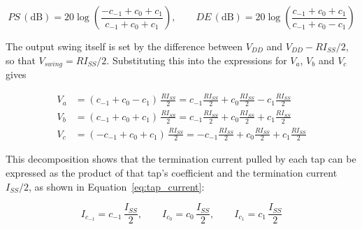 \begin{equation}
PS\,(\mathrm{dB}) = 20\log\left(\frac{-c_{-1}+c_0+c_1}{c_{-1}+c_0+c_1}\right), \qquad
DE\,(\mathrm{dB}) = 20\log\left(\frac{c_{-1}+c_0+c_1}{c_{-1}+c_0-c_1}\right)
\label{eq:tap_coefficients}
\end{equation}

The output swing itself is set by the difference between $V_{DD}$ and $V_{DD} - R I_{SS}/2$, so that $V_{swing} = R I_{SS}/2$. Substituting this into the expressions for $V_a$, $V_b$ and $V_c$ gives

\begin{align}
V_a &= (c_{-1} + c_0 - c_1)\,\frac{R I_{SS}}{2} = c_{-1}\frac{R I_{SS}}{2} + c_0\frac{R I_{SS}}{2} - c_1\frac{R I_{SS}}{2} \\
V_b &= (c_{-1} + c_0 + c_1)\,\frac{R I_{SS}}{2} = c_{-1}\frac{R I_{SS}}{2} + c_0\frac{R I_{SS}}{2} + c_1\frac{R I_{SS}}{2} \\
V_c &= (-c_{-1} + c_0 + c_1)\,\frac{R I_{SS}}{2} = -c_{-1}\frac{R I_{SS}}{2} + c_0\frac{R I_{SS}}{2} + c_1\frac{R I_{SS}}{2}
\end{align}

This decomposition shows that the termination current pulled by each tap can be expressed as the product of that tap's coefficient and the termination current $I_{SS}/2$, as shown in Equation~\eqref{eq:tap_current}:

\begin{equation}
I_{c_{-1}} = c_{-1}\,\frac{I_{SS}}{2}, \qquad I_{c_0} = c_0\,\frac{I_{SS}}{2}, \qquad I_{c_1} = c_1\,\frac{I_{SS}}{2}
\label{eq:tap_current}
\end{equation}

